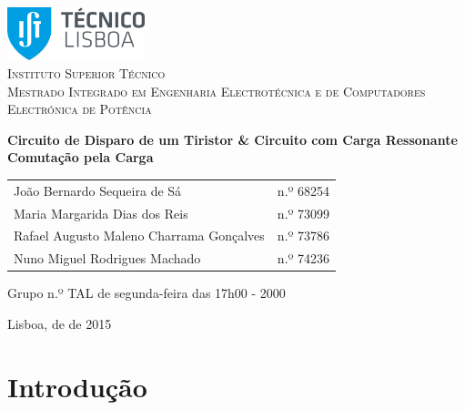 \documentclass[a4paper,11pt]{article}
\numberwithin{equation}{section}
\begin{document}
\begin{titlepage}
\begin{center}
	
\hfill \break
\hfill \break

\includegraphics[width=0.3\textwidth]{img/logo}~\\[1cm] 

\textsc{\LARGE Instituto Superior Técnico}\\[0.25cm]
\textsc{\Large Mestrado Integrado em Engenharia Electrotécnica e de Computadores}\\[1.8cm]
\textsc{\huge Electrónica de Potência}\\[0.25cm]

\vspace{6mm}

{\huge \bfseries Circuito de Disparo de um Tiristor \linebreak \& \linebreak Circuito com Carga Ressonante \linebreak Comutação pela Carga  \\[1cm]}

\begin{tabular}{ l l }
	João Bernardo Sequeira de Sá & \hspace{2mm} n.º 68254 \\
	Maria Margarida Dias dos Reis & \hspace{2mm} n.º 73099 \\
	Rafael Augusto Maleno Charrama Gonçalves & \hspace{2mm} n.º 73786 \\
	Nuno Miguel Rodrigues Machado & \hspace{2mm} n.º 74236
\end{tabular}

\vspace{7mm}

Grupo n.º TAL de segunda-feira das 17h00 - 2000

\vfill

{\large Lisboa,  de  de 2015} 
	
\end{center}
\end{titlepage}
	
\tableofcontents
\pagebreak

\section{Introdução}
\end{document}
